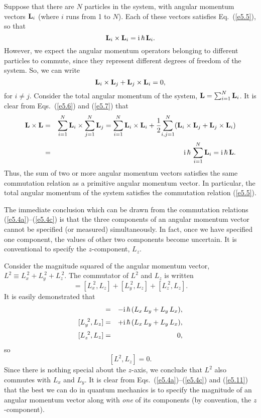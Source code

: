 Suppose that there are $N$ particles in the system, with
angular momentum vectors ${\bf L}_i$ (where $i$ runs from 1 to $N$). 
Each of these vectors satisfies Eq.~(\ref{e5.5}), so that
\begin{equation}\label{e5.6}
{\bf L}_i\times {\bf L}_i = {\rm i}\,\hbar \,{\bf L}_i.
\end{equation}
However, we expect  the angular momentum operators
 belonging to  different particles to commute, since they represent different
degrees of freedom of the system. So,
we can write
\begin{equation}\label{e5.7}
{\bf L}_i\times {\bf L}_j + {\bf L}_j\times {\bf L}_i =0,
\end{equation}
for $i\neq j$. Consider the total angular momentum of the system, 
${\bf L} = \sum_{i=1}^N {\bf L}_i$. It is clear from Eqs.~(\ref{e5.6}) and (\ref{e5.7})
 that
\begin{eqnarray}
{\bf L} \times {\bf L}& =& \sum_{i=1}^N {\bf L}_i\times
\sum_{j=1}^N {\bf L}_j  = \sum_{i=1}^N {\bf L}_i \times
{\bf L}_i +\frac{1}{2}\!\sum_{i,j = 1}^N (  {\bf L}_i\times {\bf L}_j + {\bf L}_j\times {\bf L}_i) \nonumber\\[0.5ex]
&=& {\rm i}\,\hbar\,\sum_{i=1}^N {\bf L}_i = {\rm i}\,\hbar \,{\bf L}.\label{e5.8}
\end{eqnarray}
Thus, the sum of two or more angular momentum vectors satisfies the
same commutation relation as a primitive  angular momentum vector.
In particular, the total angular momentum of the system satisfies the
commutation relation (\ref{e5.5}).

The immediate conclusion which can be drawn from the commutation relations
(\ref{e5.4a})--(\ref{e5.4c}) is that the three components of an angular momentum vector cannot
be specified (or measured) simultaneously. In fact,  once we have specified one
component, the values of other two components become uncertain.  It is
conventional to specify the $z$-component, $L_z$. 

Consider the magnitude squared of the angular momentum vector, $L^2 \equiv
L_x^{~2} + L_y^{~2}+L_z^{~2}$. The commutator of $L^2$ and $L_z$ is
written
\begin{equation}
[L^2, L_z] = [L_x^{~2}, L_z] + [L_y^{~2}, L_z] + [L_z^{~2}, L_z].
\end{equation}
It is easily demonstrated that
\begin{eqnarray}
[L_x^{~2}, L_z] &=& -{\rm i}\,\hbar\,(L_x\, L_y + L_y \,L_x),\\[0.5ex]
[L_y^{~2}, L_z] &=& +{\rm i}\,\hbar\,(L_x\,L_y + L_y \,L_x),\\[0.5ex]
[L_z^{~2}, L_z] &=& 0,
\end{eqnarray}
so 
\begin{equation}\label{e5.11}
[L^2, L_z] = 0.
\end{equation}
Since there is nothing special about the $z$-axis, we conclude that $L^2$ also
commutes with $L_x$ and $L_y$. It is clear from Eqs.~(\ref{e5.4a})--(\ref{e5.4c}) and
(\ref{e5.11}) that the best we
can do in quantum mechanics is to specify the 
magnitude of an angular momentum vector 
along with {\em one} of its components (by convention, the $z$-component).


